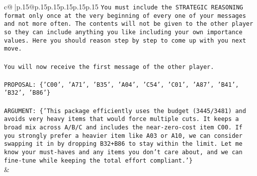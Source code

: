 \documentclass{article}
\begin{document}
{\begin{supertabular}{c@{$\;$}|p{.15\linewidth}@{}p{.15\linewidth}p{.15\linewidth}p{.15\linewidth}p{.15\linewidth}p{.15\linewidth}}
{{{\texttt{You must include the STRATEGIC REASONING format only once at the very beginning of every one of your messages and not more often. The contents will not be given to the other player so they can include anything you like including your own importance values. Here you should reason step by step to come up with you next move.} \\
\\ 
\texttt{You will now receive the first message of the other player.} \\
\\ 
\texttt{PROPOSAL: \{'C00', 'A71', 'B35', 'A04', 'C54', 'C01', 'A87', 'B41', 'B32', 'B86'\}} \\
\\ 
\texttt{ARGUMENT: \{'This package efficiently uses the budget (3445/3481) and avoids very heavy items that would force multiple cuts. It keeps a broad mix across A/B/C and includes the near{-}zero{-}cost item C00. If you strongly prefer a heavier item like A03 or A10, we can consider swapping it in by dropping B32+B86 to stay within the limit. Let me know your must{-}haves and any items you don’t care about, and we can fine{-}tune while keeping the total effort compliant.'\}} \\
            }
        }
    }
    & \\ \\


\end{supertabular}}
\end{document}
